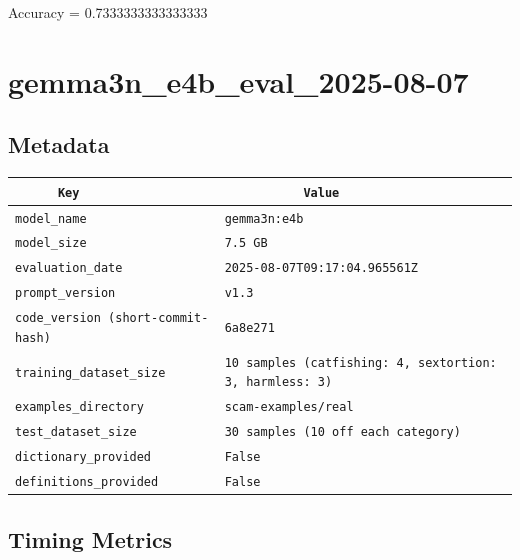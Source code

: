 \documentclass{article}
\begin{document}
\begin{center}
Accuracy = 0.7333333333333333
\end{center}

\section{gemma3n\_e4b\_eval\_2025-08-07}
\subsection{Metadata}

\begin{center}
\begin{tabular}{l | l} \hline
    \verb|      Key      | & \verb|           Value           | \\ \hline
    \hline
    \verb|model_name    | & \verb|gemma3n:e4b                  | \\ \hline
    \verb|model_size    | & \verb|7.5 GB                       | \\ \hline
    \verb|evaluation_date| & \verb|2025-08-07T09:17:04.965561Z  | \\ \hline
    \verb|prompt_version| & \verb|v1.3                         | \\ \hline
    \verb|code_version (short-commit-hash)| & \verb|6a8e271                      | \\ \hline
    \verb|training_dataset_size| & \verb|10 samples (catfishing: 4, sextortion: 3, harmless: 3)| \\ \hline
    \verb|examples_directory| & \verb|scam-examples/real           | \\ \hline
    \verb|test_dataset_size| & \verb|30 samples (10 off each category)| \\ \hline
    \verb|dictionary_provided| & \verb|False                        | \\ \hline
    \verb|definitions_provided| & \verb|False                        | \\ \hline
\end{tabular}
\end{center}

\subsection{Timing Metrics}
\end{document}
